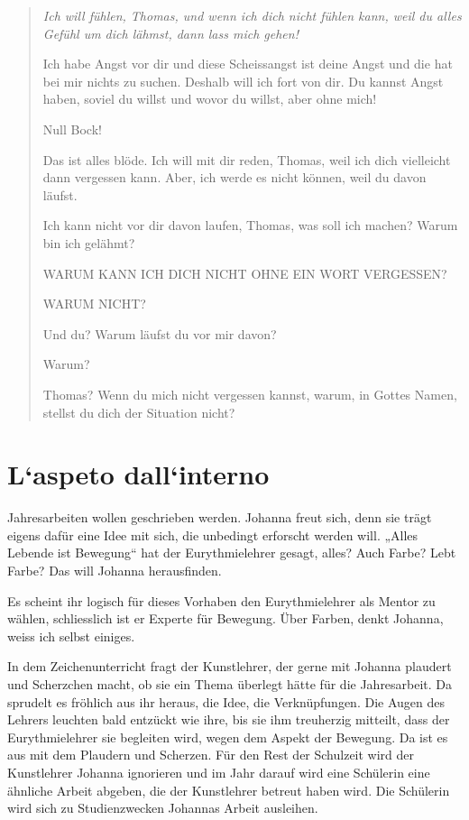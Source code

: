 \documentclass[10pt,titlepage,a5paper]{book}
\newenvironment{tg}{\begin{quote}\em}{\end{quote}}
\begin{document}
\begin{tg}
Ich will fühlen, Thomas, und wenn ich dich nicht fühlen kann, weil du alles Gefühl um dich lähmst, dann lass mich gehen!

Ich habe Angst vor dir und diese Scheissangst ist deine Angst und die hat bei mir nichts zu suchen. Deshalb will ich fort von dir. Du kannst Angst haben, soviel du willst und wovor du willst, aber ohne mich!

Null Bock!

Das ist alles blöde. Ich will mit dir reden, Thomas, weil ich dich vielleicht dann vergessen kann. Aber, ich werde es nicht können, weil du davon läufst.

Ich kann nicht vor dir davon laufen, Thomas, was soll ich machen?
Warum bin ich gelähmt?

WARUM KANN ICH DICH NICHT OHNE EIN WORT VERGESSEN? 

WARUM NICHT?

Und du? Warum läufst du vor mir davon?

 Warum?
 
Thomas? Wenn du mich nicht vergessen kannst, warum, in Gottes Namen, stellst  du dich der Situation nicht?
\end{tg}


\section*{L`aspeto dall`interno }


Jahresarbeiten wollen geschrieben werden. Johanna freut sich, denn sie trägt eigens dafür eine Idee mit sich, die unbedingt erforscht werden will. „Alles Lebende ist Bewegung“ hat der Eurythmielehrer gesagt, alles? Auch Farbe? Lebt Farbe? Das will Johanna herausfinden.

Es scheint ihr logisch für dieses Vorhaben den Eurythmielehrer als Mentor zu wählen, schliesslich ist er Experte für Bewegung. Über Farben, denkt Johanna, weiss ich selbst einiges.  

In dem Zeichenunterricht fragt der Kunstlehrer, der gerne mit Johanna plaudert und Scherzchen macht, ob sie ein Thema überlegt hätte für die Jahresarbeit. Da sprudelt es fröhlich aus ihr heraus, die Idee, die Verknüpfungen. Die Augen des Lehrers leuchten bald entzückt wie ihre, bis sie ihm treuherzig mitteilt, dass der Eurythmielehrer sie begleiten wird, wegen dem Aspekt der Bewegung. Da ist es aus mit dem Plaudern und Scherzen. Für den Rest der Schulzeit wird der Kunstlehrer Johanna ignorieren und im Jahr darauf wird eine Schülerin eine ähnliche Arbeit abgeben, die der Kunstlehrer betreut haben wird. Die Schülerin wird sich zu Studienzwecken Johannas Arbeit ausleihen.
\end{document}
